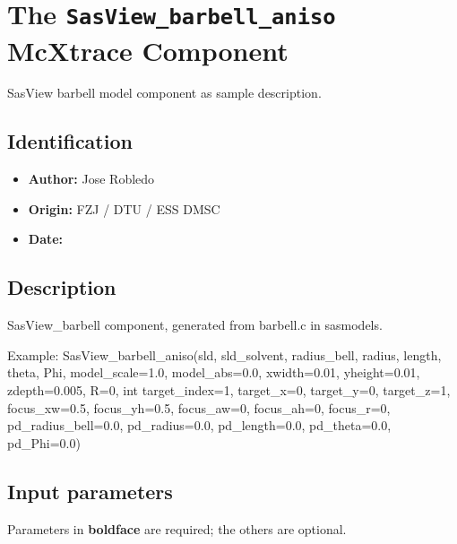 \section{The \texttt{SasView\_barbell\_aniso} McXtrace Component}
SasView barbell model component as sample description.

\subsection*{Identification}
\begin{itemize}
  \item \textbf{Author:} Jose Robledo
  \item \textbf{Origin:} FZJ / DTU / ESS DMSC
  \item \textbf{Date:} 
\end{itemize}

\subsection*{Description}
SasView\_barbell component, generated from barbell.c in sasmodels.

Example: SasView\_barbell\_aniso(sld, sld\_solvent, radius\_bell, radius, length, theta, Phi, model\_scale=1.0, model\_abs=0.0, xwidth=0.01, yheight=0.01, zdepth=0.005, R=0, int target\_index=1, target\_x=0, target\_y=0, target\_z=1, focus\_xw=0.5, focus\_yh=0.5, focus\_aw=0, focus\_ah=0, focus\_r=0, pd\_radius\_bell=0.0, pd\_radius=0.0, pd\_length=0.0, pd\_theta=0.0, pd\_Phi=0.0)

\subsection*{Input parameters}
Parameters in \textbf{boldface} are required; the others are optional.

